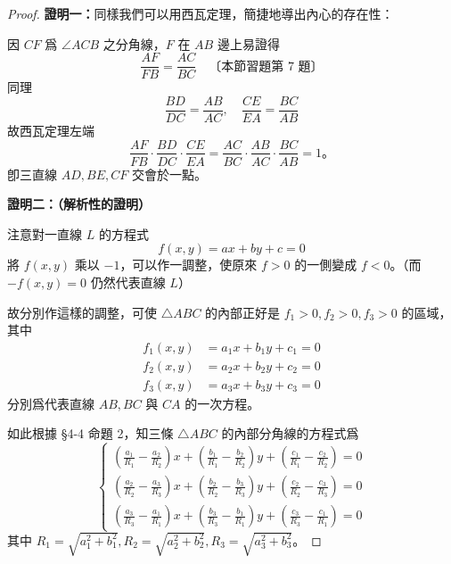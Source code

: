 \begin{proof}
\textbf{證明一：}同樣我們可以用西瓦定理，簡捷地導出內心的存在性：

因 $CF$ 爲 $\angle ACB$ 之分角線，$F$ 在 $AB$ 邊上易證得
\[
\frac{AF}{FB} = \frac{AC}{BC} \quad \text{〔本節習題第 7 題〕}
\]
同理
\[
\frac{BD}{DC} = \frac{AB}{AC}, \quad \frac{CE}{EA} = \frac{BC}{AB}
\]
故西瓦定理左端
\[
\frac{AF}{FB} \cdot \frac{BD}{DC} \cdot \frac{CE}{EA} = \frac{AC}{BC} \cdot \frac{AB}{AC} \cdot \frac{BC}{AB} = 1\text{。}
\]
卽三直線 $AD, BE, CF$ 交會於一點。

\textbf{證明二：（解析性的證明）}

注意對一直線 $L$ 的方程式
\[
f(x, y) = ax + by + c = 0
\]
將 $f(x, y)$ 乘以 $-1$，可以作一調整，使原來 $f > 0$ 的一側變成 $f < 0$。（而 $-f(x, y) = 0$ 仍然代表直線 $L$）

故分別作這樣的調整，可使 $\triangle ABC$ 的內部正好是 $f_1 > 0, f_2 > 0, f_3 > 0$ 的區域，其中
\begin{align*}
f_1(x, y) &= a_1 x + b_1 y + c_1 = 0 \\
f_2(x, y) &= a_2 x + b_2 y + c_2 = 0 \\
f_3(x, y) &= a_3 x + b_3 y + c_3 = 0
\end{align*}
分別爲代表直線 $AB, BC$ 與 $CA$ 的一次方程。

如此根據 \S 4-4 命題 2，知三條 $\triangle ABC$ 的內部分角線的方程式爲
\[
\begin{cases}
\left(\frac{a_1}{R_1} - \frac{a_2}{R_2}\right)x + \left(\frac{b_1}{R_1} - \frac{b_2}{R_2}\right)y + \left(\frac{c_1}{R_1} - \frac{c_2}{R_2}\right) = 0 \\
\left(\frac{a_2}{R_2} - \frac{a_3}{R_3}\right)x + \left(\frac{b_2}{R_2} - \frac{b_3}{R_3}\right)y + \left(\frac{c_2}{R_2} - \frac{c_3}{R_3}\right) = 0 \\
\left(\frac{a_3}{R_3} - \frac{a_1}{R_1}\right)x + \left(\frac{b_3}{R_3} - \frac{b_1}{R_1}\right)y + \left(\frac{c_3}{R_3} - \frac{c_1}{R_1}\right) = 0
\end{cases}
\]
其中 $R_1 = \sqrt{a_1^2 + b_1^2}, R_2 = \sqrt{a_2^2 + b_2^2}, R_3 = \sqrt{a_3^2 + b_3^2}$。


\end{proof}
